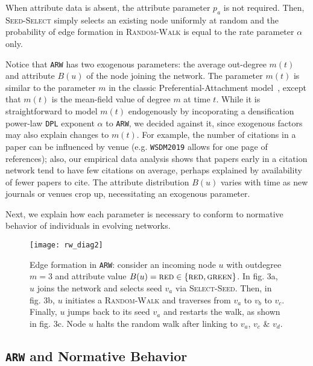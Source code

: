 When attribute data is absent, the attribute parameter $p_a$ is not required.
Then, \textsc{Seed-Select} simply selects an existing node uniformly at random
and the probability of edge formation in \textsc{Random-Walk} is equal to
the rate parameter $\alpha$ only.

Notice that \texttt{ARW} has two exogenous parameters:  the average out-degree $m(t)$ and attribute $B(u)$ of the node joining the network. The parameter $m(t)$ is similar to the parameter $m$ in the classic Preferential-Attachment model~\cite{barabasi1999emergence}, except that $m(t)$ is the mean-field value of degree $m$ at time $t$. While it is straightforward to model $m(t)$ endogenously by incoporating a densification power-law \texttt{DPL} exponent $\alpha$ to \texttt{ARW}, we decided against it, since exogenous factors may also explain changes to $m(t)$. For example, the number of citations in a paper can be influenced by venue (e.g. \texttt{WSDM2019} allows for one page of references); also, our empirical data analysis shows that papers early in a citation network tend to have few citations on average, perhaps explained by availability of {fewer} papers to cite. The attribute distribution $B(u)$ varies with time as new journals or venues crop up, necessitating an exogenous parameter.



Next, we explain how each parameter is necessary to conform to normative
behavior of individuals in evolving networks.

\begin{figure*}
	\vspace{-20pt}
    \centering
    \texttt{[image: rw\_diag2]}
    \caption{Edge formation in \texttt{ARW}: consider
    an incoming node $u$ with outdegree ${m=3}$ and attribute value {$B(u)=\textsc{red} \in \{\textsc{red},\textsc{green}\}$}.
    In fig. 3a, $u$ joins the network and selects seed $v_a$ via \textsc{Select-Seed}.
    Then, in fig. 3b, $u$ initiates a \textsc{Random-Walk} and traverses from $v_a$ to $v_b$ to $v_c$.
    Finally, $u$ jumps back to its seed $v_a$ and restarts the walk, as shown in fig. 3c.
    Node $u$ halts the random walk after linking to $v_a$, $v_c$ \& $v_d$.
    }
    \label{fig:randomwalk}
	\vspace{-8pt}
\end{figure*}


\subsection{\texttt{ARW} and Normative Behavior}
\label{sub:Model Interpretation}

